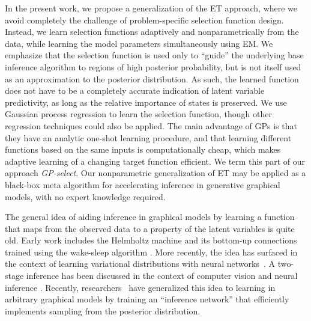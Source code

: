In the present work, we propose a generalization of the ET approach, where
we avoid completely the challenge of problem-specific selection function design.
Instead,
we learn selection functions  adaptively and nonparametrically
from the data,
 while learning the model
parameters  simultaneously using EM.
We emphasize that the selection function is  used only to ``guide'' the underlying
base inference algorithm to regions of high posterior probability, but is not itself
used as an approximation to the posterior distribution. As such, the learned
function does not have to be a completely accurate indication of latent
variable predictivity,
as long as the relative importance of states is preserved.
We use  Gaussian process
regression \citep{RasmussenGPbook} to learn the selection function, though other regression techniques could
also be applied. The main advantage of GPs
is that they have an analytic one-shot learning procedure, and that learning different
functions based on the same inputs is computationally cheap, which makes adaptive learning
of a changing target function efficient. We term this part of our approach
\textit{GP-select}.
Our nonparametric generalization of  ET may be applied as a black-box
meta algorithm for accelerating inference in  generative graphical models,
with no expert knowledge required.



The general idea of aiding inference in graphical models by
learning a function that maps from the observed data to
a property of the latent variables is quite old. Early work includes the
Helmholtz machine \citep{Dayan95} and its bottom-up connections trained using the wake-sleep
algorithm \citep{HintonEtAl1995}.
More recently, the idea has surfaced in the context of learning variational distributions with neural networks~\citep{WellingICML2014}.
A two-stage inference has  been discussed in the context of
computer vision \citep{YuilleKersten2006} and neural inference \citep{KoernerEtAl1999}.
Recently, researchers~\citep{MnihGregor2014} %
have generalized this idea to learning in arbitrary graphical models by training
an ``inference network'' that efficiently implements sampling from the posterior
distribution.


